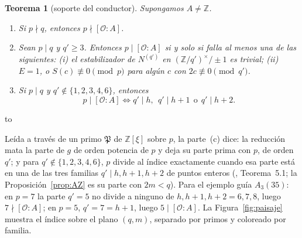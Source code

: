 \documentclass[11pt,a4paper]{article}
\newtheorem{theorem}{Teorema}
\theoremstyle{definition}
\newcommand{\ZZ}{\mathbb{Z}}
\newcommand{\cO}{\mathcal{O}}
\newenvironment{keybox}
  {\par\vspace{9pt}\begin{lrbox}{\fichabox}%
   \begin{minipage}{0.90\textwidth}\vspace{7pt}\setlength{\parskip}{3pt}}
  {\vspace{7pt}\end{minipage}\end{lrbox}%
   \par\needspace{\dimexpr\ht\fichabox+\dp\fichabox+12pt\relax}\noindent\hbox to \textwidth{\hfill
   \textcolor{azul}{\rule[-\dp\fichabox]{3.2pt}{\dimexpr\ht\fichabox+\dp\fichabox\relax}}%
   \colorbox{fondoficha}{\usebox{\fichabox}}\hfill}%
   \par\vspace{9pt}}
\begin{document}
\begin{keybox}
\begin{theorem}[soporte del conductor]\label{thm:sop}
Supongamos $A\ne\ZZ$.
\begin{enumerate}
\item[(a)] Si $p\nmid q$, entonces $p\nmid[\cO:A]$.
\item[(b)] Sean $p\mid q$ y $q'\ge3$. Entonces $p\mid[\cO:A]$ si y solo si falla al menos una de las siguientes:
 \emph{(i)} el estabilizador de $N^{(q')}$ en $(\ZZ/q')^\times/\pm1$ es trivial;
 \emph{(ii)} $E=1$, o $S(c)\not\equiv0\pmod p$ para algún $c$ con $2c\not\equiv0\pmod{q'}$.
\item[(c)] Si $p\mid q$ y $q'\notin\{1,2,3,4,6\}$, entonces
 \[ p\mid[\cO:A]\iff q'\mid h,\ \ q'\mid h+1\ \ \text{o}\ \ q'\mid h+2 . \]
\end{enumerate}
\end{theorem}
\end{keybox}

\noindent Leída a través de un primo $\mathfrak P$ de $\ZZ[\xi]$ sobre $p$, la parte~(c) dice: la reducción mata la
parte de $g$ de orden potencia de $p$ y deja su parte prima con $p$, de orden $q'$; y para $q'\notin\{1,2,3,4,6\}$, $p$
divide al índice exactamente cuando esa parte está en una de las tres familias $q'\mid h,h+1,h+2$ de puntos enteros
(\cite{Mar26}, Teorema~5.1; la Proposición~\ref{prop:AZ} es su parte con $2m<q$).
Para el ejemplo guía $A_3(35)$: en $p=7$ la parte $q'=5$ no divide a ninguno de $h,h+1,h+2=6,7,8$, luego
$7\nmid[\cO:A]$; en $p=5$, $q'=7=h+1$, luego $5\mid[\cO:A]$.
La Figura~\ref{fig:paisaje} muestra el índice sobre el plano $(q,m)$, separado por primos y coloreado por familia.
\end{document}
